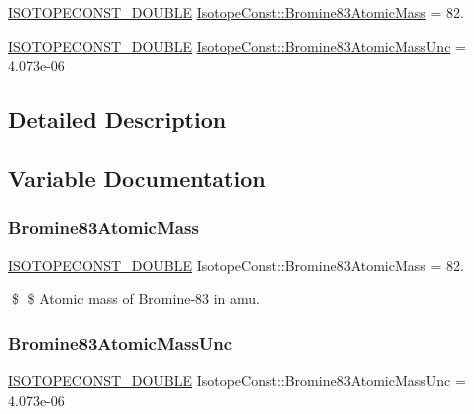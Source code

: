\begin{DoxyCompactItemize}
\item 
\mbox{\hyperlink{group___isotope_const-_macros_ga8f45a7272ce02c0b4c65c44636ed719a}{I\+S\+O\+T\+O\+P\+E\+C\+O\+N\+S\+T\+\_\+\+D\+O\+U\+B\+LE}} \mbox{\hyperlink{group___isotope_const-_bromine-_br83_gafead8dfdf1d0fa220725fb29caba20f0}{Isotope\+Const\+::\+Bromine83\+Atomic\+Mass}} = 82.
\item 
\mbox{\hyperlink{group___isotope_const-_macros_ga8f45a7272ce02c0b4c65c44636ed719a}{I\+S\+O\+T\+O\+P\+E\+C\+O\+N\+S\+T\+\_\+\+D\+O\+U\+B\+LE}} \mbox{\hyperlink{group___isotope_const-_bromine-_br83_gade7a12b8efce3c30bcb34b370e4e4a94}{Isotope\+Const\+::\+Bromine83\+Atomic\+Mass\+Unc}} = 4.\+073e-\/06
\end{DoxyCompactItemize}


\subsection{Detailed Description}


\subsection{Variable Documentation}
\mbox{\label{group___isotope_const-_bromine-_br83_gafead8dfdf1d0fa220725fb29caba20f0}} 
\subsubsection{\texorpdfstring{Bromine83\+Atomic\+Mass}{Bromine83AtomicMass}}
{\footnotesize\ttfamily \mbox{\hyperlink{group___isotope_const-_macros_ga8f45a7272ce02c0b4c65c44636ed719a}{I\+S\+O\+T\+O\+P\+E\+C\+O\+N\+S\+T\+\_\+\+D\+O\+U\+B\+LE}} Isotope\+Const\+::\+Bromine83\+Atomic\+Mass = 82.}

\$ \$ Atomic mass of Bromine-\/83 in amu. \mbox{\label{group___isotope_const-_bromine-_br83_gade7a12b8efce3c30bcb34b370e4e4a94}} 
\subsubsection{\texorpdfstring{Bromine83\+Atomic\+Mass\+Unc}{Bromine83AtomicMassUnc}}
{\footnotesize\ttfamily \mbox{\hyperlink{group___isotope_const-_macros_ga8f45a7272ce02c0b4c65c44636ed719a}{I\+S\+O\+T\+O\+P\+E\+C\+O\+N\+S\+T\+\_\+\+D\+O\+U\+B\+LE}} Isotope\+Const\+::\+Bromine83\+Atomic\+Mass\+Unc = 4.\+073e-\/06}

